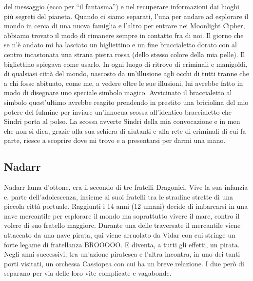 \documentclass{article}
\begin{document}
del messaggio (ecco per “il fantasma”) e nel recuperare informazioni dai luoghi più segreti del pianeta. Quando ci siamo separati, l’una per andare ad esplorare il mondo in cerca di una nuova famiglia e l’altro per entrare nei Moonlight Cipher, abbiamo trovato il modo di rimanere sempre in contatto fra di noi. Il giorno che se n’è andato mi ha lasciato un bigliettino e un fine braccialetto dorato con al centro incastonata una strana pietra rossa (dello stesso colore della mia pelle). Il bigliettino spiegava come usarlo. In ogni luogo di ritrovo di criminali e manigoldi, di qualsiasi città del mondo, nascosto da un’illusione agli occhi di tutti tranne che a chi fosse abituato, come me, a vedere oltre le sue illusioni, lui avrebbe fatto in modo di disegnare uno speciale simbolo magico. Avvicinato il braccialetto al simbolo quest’ultimo avrebbe reagito prendendo in prestito una briciolina del mio potere del fulmine per inviare un’innocua scossa all’identico braccialetto che Sindri porta al polso. La scossa avverte Sindri della mia convocazione e in men che non si dica, grazie alla sua schiera di aiutanti e alla rete di criminali di cui fa parte, riesce a scoprire dove mi trovo e a presentarsi per darmi una mano. 
\subsection{Nadarr}Nadarr lama d'ottone, era il secondo di tre fratelli Dragonici. Vive la sua infanzia e, parte dell'adolescenza, insieme ai suoi fratelli tra le stradine strette di una piccola città portuale. Raggiunti i 14 anni (12 umani) decide di imbarcarsi in una nave mercantile per esplorare il mondo ma soprattutto vivere il mare, contro il volere di suo fratello maggiore. Durante una delle traversate il mercantile viene attaccato da una nave pirata, qui viene arruolato da Vidar con cui stringe un forte legame di fratellanza BROOOOO. E diventa, a tutti gli effetti, un pirata.  Negli anni successivi, tra un'azione piratesca e l'altra incontra, in uno dei tanti porti visitati, un orchessa Cassiopea con cui ha un breve relazione. I due però di separano per via delle loro vite complicate e vagabonde.
\end{document}
